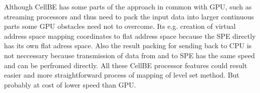 \par
Although CellBE has some parts of the approach in common with GPU, such as streaming processors and thus need to pack the input data into larger continuous parts some GPU obstacles need not to overcome. Its e.g. creation of virtual address space mapping coordinates to flat address space because the SPE directly has its own flat adress space. Also the result packing for sending back to CPU is not neccessary because transmission of data from and to SPE has the same speed and can be perfromed directly. All these CellBE processor features could result easier and more straightforward process of mapping of level set method. But probably at cost of lower speed than GPU.